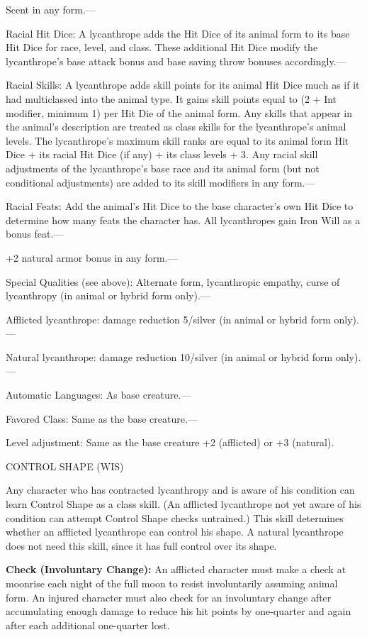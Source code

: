 \documentclass{article}
\begin{document}
Scent in any form.---

Racial Hit Dice: A lycanthrope adds the Hit Dice of its animal form to its base 
Hit Dice for race, level, and class. These additional Hit Dice modify the lycanthrope's 
base attack bonus and base saving throw bonuses accordingly.---

Racial Skills: A lycanthrope adds skill points for its animal Hit Dice much as 
if it had multiclassed into the animal type. It gains skill points equal to (2 
+ Int modifier, minimum 1) per Hit Die of the animal form. Any skills that appear 
in the animal's description are treated as class skills for the lycanthrope's animal 
levels. The lycanthrope's maximum skill ranks are equal to its animal form Hit 
Dice + its racial Hit Dice (if any) + its class levels + 3. Any racial skill adjustments 
of the lycanthrope's base race and its animal form (but not conditional adjustments) 
are added to its skill modifiers in any form.---

Racial Feats: Add the animal's Hit Dice to the base character's own Hit Dice to 
determine how many feats the character has. All lycanthropes gain Iron Will as 
a bonus feat.--- 

\parindent=3pt
+2 natural armor bonus in any form.---

\parindent=0pt
Special Qualities (see above): Alternate form, lycanthropic empathy, curse of lycanthropy 
(in animal or hybrid form only).---

Afflicted lycanthrope: damage reduction 5/silver (in animal or hybrid form only).---

Natural lycanthrope: damage reduction 10/silver (in animal or hybrid form only).---

Automatic Languages: As base creature.---

Favored Class: Same as the base creature.---

Level adjustment: Same as the base creature +2 (afflicted) or +3 (natural).

\vspace{12pt}
CONTROL SHAPE (WIS)

Any character who has contracted lycanthropy and is aware of his condition can 
learn Control Shape as a class skill. (An afflicted lycanthrope not yet aware of 
his condition can attempt Control Shape checks untrained.) This skill determines 
whether an afflicted lycanthrope can control his shape. A natural lycanthrope does 
not need this skill, since it has full control over its shape. 

\textbf{Check (Involuntary Change):} An afflicted character must make a check at 
moonrise each night of the full moon to resist involuntarily assuming animal form. 
An injured character must also check for an involuntary change after accumulating 
enough damage to reduce his hit points by one-quarter and again after each additional 
one-quarter lost.
\end{document}
